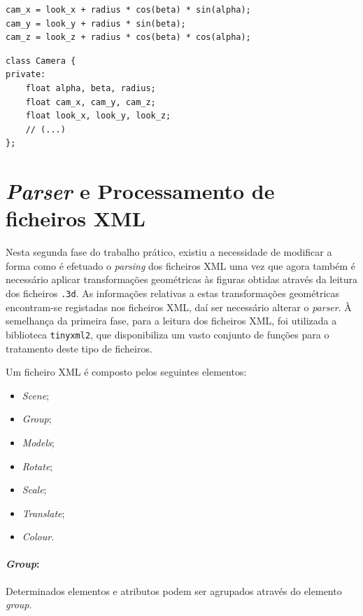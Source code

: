 \documentclass[a4paper, 11pt]{article}
\begin{document}
\begin{verbatim}
cam_x = look_x + radius * cos(beta) * sin(alpha);
cam_y = look_y + radius * sin(beta);
cam_z = look_z + radius * cos(beta) * cos(alpha);
\end{verbatim}

\begin{verbatim}
class Camera {
private:
    float alpha, beta, radius;
    float cam_x, cam_y, cam_z;
    float look_x, look_y, look_z;
    // (...)
};
\end{verbatim}

\pagebreak

\section{\textit{Parser} e Processamento de ficheiros XML}

Nesta segunda fase do trabalho prático, existiu a necessidade de modificar a forma
como é efetuado o \textit{parsing} dos ficheiros XML uma vez que agora também é
necessário aplicar transformações geométricas às figuras obtidas através da leitura
dos ficheiros \texttt{.3d}. As informações relativas a estas transformações geométricas
encontram-se registadas nos ficheiros XML, daí ser necessário alterar o \textit{parser}.
À semelhança da primeira fase, para a leitura dos ficheiros XML, foi utilizada a
biblioteca \texttt{tinyxml2}, que disponibiliza um vasto conjunto de funções para o
tratamento deste tipo de ficheiros.

Um ficheiro XML é composto pelos seguintes elementos:

\begin{multicols}{2}
\begin{itemize}
    \item \textit{Scene};
    \item \textit{Group};
    \item \textit{Models};
    \item \textit{Rotate};
    \item \textit{Scale};
    \item \textit{Translate};
    \item \textit{Colour}.
\end{itemize}
\end{multicols}

\paragraph{\textit{Group}:} Determinados elementos e atributos podem ser agrupados
através do elemento \textit{group}.
\end{document}
